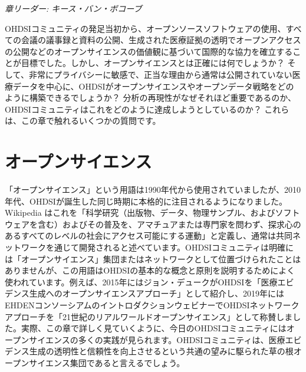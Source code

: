 \documentclass[
  11pt]{book}
\theoremstyle{definition}
\theoremstyle{definition}
\theoremstyle{definition}
\theoremstyle{definition}
\theoremstyle{remark}
\begin{document}

\emph{章リーダー: キース・バン・ボコーブ}

OHDSIコミュニティの発足当初から、オープンソースソフトウェアの使用、すべての会議の議事録と資料の公開、生成された医療証拠の透明でオープンアクセスの公開などのオープンサイエンスの価値観に基づいて国際的な協力を確立することが目標でした。しかし、オープンサイエンスとは正確には何でしょうか？ そして、非常にプライバシーに敏感で、正当な理由から通常は公開されていない医療データを中心に、OHDSIがオープンサイエンスやオープンデータ戦略をどのように構築できるでしょうか？ 分析の再現性がなぜそれほど重要であるのか、OHDSIコミュニティはこれをどのように達成しようとしているのか？ これらは、この章で触れるいくつかの質問です。

\section{オープンサイエンス}\label{ux30aaux30fcux30d7ux30f3ux30b5ux30a4ux30a8ux30f3ux30b9}

「オープンサイエンス」という用語は1990年代から使用されていましたが、2010年代、OHDSIが誕生した同じ時期に本格的に注目されるようになりました。Wikipedia \citep{wiki:Open_science} はこれを「科学研究（出版物、データ、物理サンプル、およびソフトウェアを含む）およびその普及を、アマチュアまたは専門家を問わず、探求心のあるすべてのレベルの社会にアクセス可能にする運動」と定義し、通常は共同ネットワークを通じて開発されると述べています。OHDSIコミュニティは明確には「オープンサイエンス」集団またはネットワークとして位置づけられたことはありませんが、この用語はOHDSIの基本的な概念と原則を説明するためによく使われています。例えば、2015年にはジョン・デュークがOHDSIを「医療エビデンス生成へのオープンサイエンスアプローチ」として紹介し、2019年にはEHDENコンソーシアムのイントロダクションウェビナーでOHDSIネットワークアプローチを「21世紀のリアルワールドオープンサイエンス」として称賛しました。実際、この章で詳しく見ていくように、今日のOHDSIコミュニティにはオープンサイエンスの多くの実践が見られます。OHDSIコミュニティは、医療エビデンス生成の透明性と信頼性を向上させるという共通の望みに駆られた草の根オープンサイエンス集団であると言えるでしょう。
\end{document}
